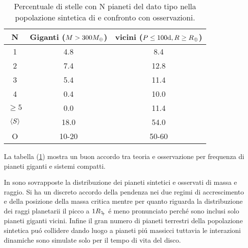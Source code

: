 

\begin{table}
\begin{tabular}{|ccc|}
\hline
N&Giganti ($M>300M_{\oplus}{}$)&vicini ($P\leq100\si{\day}, R\geq\rearth{}$)\\
\hline
1&4.8&8.4\\
2&7.4&12.8\\
3&5.4&11.4\\
4&0.4&10.0\\
$\geq5$&0.0&11.4\\
$\langle S \rangle$&18.0&54.0\\
O&10-20&50-60\\
\hline
\end{tabular}
\caption{Percentuale di stelle con N pianeti del dato tipo nella popolazione sintetica di \cite{mordasini2018planetary} e confronto con osservazioni.}\label{tab:planetfreq}
\end{table}

La tabella (\ref{tab:planetfreq}) mostra un buon accordo tra teoria e osservazione per frequenza di pianeti giganti e sistemi compatti.

In \cite{fig:MR-freq-obssynth} sono sovrapposte la distribuzione dei pianeti sintetici e osservati di massa e raggio. Si ha un discreto accordo della pendenza nei due regimi di accrescimento e della posizione della massa critica mentre per quanto riguarda la distribuzione dei raggi planetarii il picco a $1\rjupiter{}$ \'e meno pronunciato perch\'e sono inclusi solo pianeti giganti vicini.
Infine il gran numero di pianeti terrestri della popolazione sintetica pu\'o collidere dando luogo a pianeti pi\'u massicci tuttavia le interazioni dinamiche sono simulate solo per il tempo di vita del disco.

